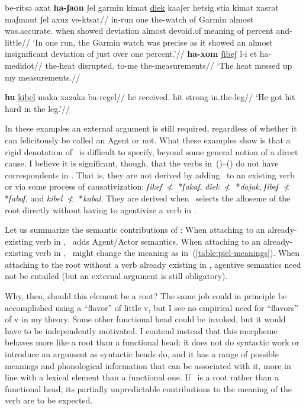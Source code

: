  \a \begingl
    \gla be-ritsa axat \textbf{ha-ʃaon} ʃel garmin kimat \underline{diek} kaaʃer hetsig stia kimat xasrat maʃmaut ʃel axuz ve-ktsat//
    \glb in-run one the-watch of Garmin almost was.accurate. when showed deviation almost devoid.of meaning of percent and-little//
    \glft `In one run, the Garmin watch was precise as it showed an almost insignificant deviation of just over one percent.'//
  \endgl
  \a \begingl
    \gla \textbf{ha-xom} \underline{ʃibeʃ} l-i et ha-medidot//
    \glb the-heat disrupted. to-me  the-measurements//
    \glft `The heat messed up my measurements.//
  \endgl
\xe

\ex \begingl
  \gla \textbf{hu} \underline{kibel} maka xazaka ba-regel//
  \glb he received. hit strong in.the-leg//
  \glft `He got hit hard in the leg.'//
  \endgl
\xe

In these examples an external argument is still required, regardless of whether it can felicitously be called an Agent or not. What these examples show is that a rigid denotation of \va~is difficult to specify, beyond some general notion of a direct cause. I believe it is significant, though, that the verbs in~(\blastx)--(\lastx) do not have correspondents in \tkal. That is, they are not derived by adding \va~to an existing verb or via some process of causativization: \emph{ʃikef} $\nless$ *\emph{ʃakaf}, \emph{diek} $\nless$ *\emph{dajak}, \emph{ʃibeʃ} $\nless$ *\emph{ʃabaʃ}, and \emph{kibel} $\nless$ *\emph{kabal}. They are derived when \va~selects the alloseme of the root directly without having to agentivize a verb in \tkal.

Let us summarize the semantic contributions of \va:
\pex
  \a When attaching to an already-existing verb in \tkal, \va~adds Agent/Actor semantics.
  \a When attaching to an already-existing verb in \tkal, \va~might change the meaning as in~(\ref{table:piel-meanings}).
  \a When attaching to the root without a verb already existing in \tkal, agentive semantics need not be entailed (but an external argument is still obligatory).
\xe

Why, then, should this element be a root? The same job could in principle be accomplished using a  ``flavor'' of little v{, but I see no empirical need for ``flavors'' of v in my theory. }{Some other} functional head could be invoked, but it would have to be independently motivated. {I contend instead that} this morpheme behaves more like a root than a functional head: it does not {do syntactic work or }introduce an argument as syntactic heads do, and it has a range of possible meanings and phonological information that can be associated with it, more in line with a lexical element than a functional one. If \va~is a root rather than a functional head, its partially unpredictable contributions to the meaning of the verb are to be expected.

